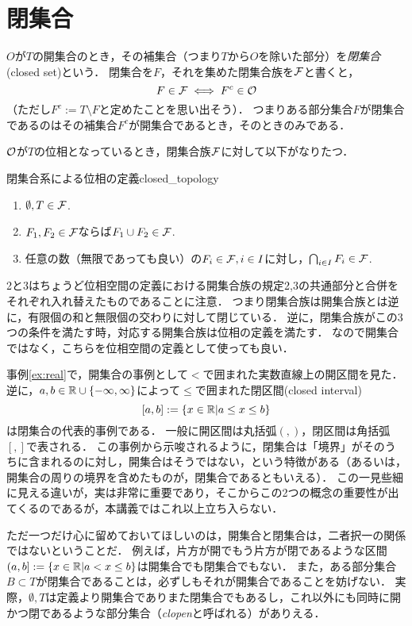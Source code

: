 \documentclass[11pt,a4paper, dvipdfmx]{jsarticle}
\begin{document}
\section{閉集合}
$O$が$T$の開集合のとき，その補集合（つまり$T$から$O$を除いた部分）を\emph{閉集合}(closed set)という．
閉集合を$F$，それを集めた閉集合族を$\mathcal{F}$と書くと，
\[
 F \in \mathcal{F} \iff F^c \in \mathcal{O}
\]
（ただし$F^c := T \setminus F$と定めたことを思い出そう）．
つまりある部分集合$F$が閉集合であるのはその補集合$F^c$が開集合であるとき，そのときのみである．

$\mathcal{O}$が$T$の位相となっているとき，閉集合族$\mathcal{F}$に対して以下がなりたつ．
\begin{dfn}{閉集合系による位相の定義}{closed_topology}
  \begin{enumerate}
    \item $\emptyset, T \in \mathcal{F}$.
    \item $F_1, F_2 \in \mathcal{F}$ならば$F_1 \cup F_2 \in \mathcal{F}$.
    \item 任意の数（無限であっても良い）の$F_i \in \mathcal{F}, i \in I$に対し，$\bigcap_{i \in I} F_i \in \mathcal{F}$.
  \end{enumerate}
\end{dfn}

2と3はちょうど位相空間の定義における開集合族の規定2,3の共通部分と合併をそれぞれ入れ替えたものであることに注意．
つまり閉集合族は開集合族とは逆に，有限個の和と無限個の交わりに対して閉じている．
逆に，閉集合族がこの3つの条件を満たす時，対応する開集合族は位相の定義を満たす．
なので開集合ではなく，こちらを位相空間の定義として使っても良い．

事例\ref{ex:real}で，開集合の事例として$<$で囲まれた実数直線上の開区間を見た．
逆に，$a, b \in \mathbb{R} \cup \{-\infty, \infty\}$によって$\leq$で囲まれた閉区間(closed interval)
\[
  [a, b] := \{ x \in \mathbb{R}| a \leq x \leq b \}
\]
は閉集合の代表的事例である．
一般に開区間は丸括弧$(,)$，閉区間は角括弧$[,]$で表される．
この事例から示唆されるように，閉集合は「境界」がそのうちに含まれるのに対し，開集合はそうではない，という特徴がある（あるいは，開集合の周りの境界を含めたものが，閉集合であるともいえる）．
この一見些細に見える違いが，実は非常に重要であり，そこからこの2つの概念の重要性が出てくるのであるが，本講義ではこれ以上立ち入らない．

ただ一つだけ心に留めておいてほしいのは，開集合と閉集合は，二者択一の関係ではないということだ．
例えば，片方が開でもう片方が閉であるような区間$(a, b] := \{ x \in \mathbb{R}| a < x \leq b \}$は開集合でも閉集合でもない．
また，ある部分集合$B \subset T$が閉集合であることは，必ずしもそれが開集合であることを妨げない．
実際，$\emptyset, T$は定義より開集合でありまた閉集合でもあるし，これ以外にも同時に開かつ閉であるような部分集合（\emph{clopen}と呼ばれる）がありえる．
\end{document}
